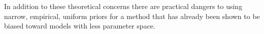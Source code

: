 In addition to these theoretical concerns there are practical dangers to using
narrow, empirical, uniform priors for a method that has already been shown to
be biased toward models with less parameter space.


